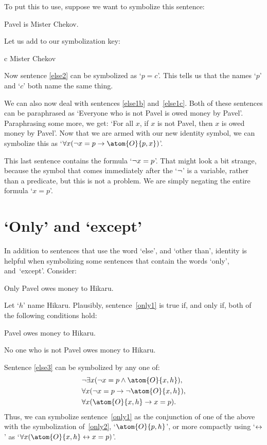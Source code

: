 To put this to use, suppose we want to symbolize this sentence:
\begin{earg}
\item[\ex{else2}] Pavel is Mister Chekov.
\end{earg}
Let us add to our symbolization key:
	\begin{ekey}
		\item[c] Mister Chekov
	\end{ekey}
Now sentence \ref{else2} can be symbolized as `$p=c$'. This tells us that the names `$p$' and `$c$' both name the same thing.

We can also now deal with sentences \ref{else1b} and~\ref{else1c}. Both of these sentences can be  paraphrased as `Everyone who is not Pavel is owed money by Pavel'. Paraphrasing some more, we get: `For all $x$, if $x$ is not Pavel, then $x$ is owed money by Pavel'. Now that we are armed with our new identity symbol, we can symbolize this as `$\forall x (\enot x = p \eif \atom{O}{p,x})$'.

This last sentence contains the formula `$\neg x = p$'. That might look a bit strange, because the symbol that comes immediately after the `$\neg$' is a variable, rather than a predicate, but this is not a problem. We are simply negating the entire formula `$x = p$'.

\section{`Only' and `except'}

In addition to sentences that use the word `else', and `other than', identity is helpful when symbolizing some sentences that contain the words `only', and~`except'. Consider:
\begin{earg}
\item[\ex{only1}] Only Pavel owes money to Hikaru.
\end{earg}
Let `$h$' name Hikaru. Plausibly, sentence~\ref{only1} is true if, and only if, both of the following conditions hold:
\begin{earg}
	\item[\ex{only2}] Pavel owes money to Hikaru.
	\item[\ex{else3}] No one who is not Pavel owes money to Hikaru.
\end{earg}
Sentence \ref{else3} can be symbolized by any one of:
\begin{align*}
	& \enot\exists x(\enot x = p \eand \atom{O}{x,h}),\\
	& \forall x(\enot x = p \eif \enot\atom{O}{x,h}),\\
	& \forall x(\atom{O}{x,h} \eif x = p).
\end{align*}
Thus, we can symbolize sentence~\ref{only1} as the conjunction of one of the above with the symbolization of~\ref{only2}, `$\atom{O}{p,h}$', or more compactly using `$\leftrightarrow$' as `$\forall x(\atom{O}{x,h} \eiff x = p)$'.

